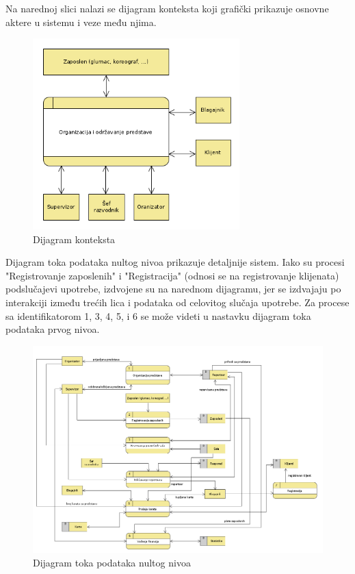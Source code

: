 \documentclass[a4paper]{article}
\begin{document}
Na narednoj slici nalazi se dijagram konteksta koji grafički prikazuje
osnovne aktere u sistemu i veze među njima.

\begin{figure}[H]
  \begin{center}
      \includegraphics[width=80mm]{../images/dfd0.png}
  \end{center}
  \caption{Dijagram konteksta}
  \label{dfd0}
\end{figure}

Dijagram toka podataka nultog nivoa prikazuje detaljnije sistem. Iako su procesi "Registrovanje zaposlenih"
i "Registracija" (odnosi se na registrovanje klijenata) podslučajevi upotrebe, izdvojene su na narednom dijagramu,
jer se izdvajaju po interakciji između trećih lica i podataka od celovitog slučaja upotrebe. Za
procese sa identifikatorom 1, 3, 4, 5, i 6 se može videti u nastavku dijagram toka podataka prvog nivoa.

\begin{figure}[H]
  \begin{center}
      \includegraphics[width=140mm]{../images/dfd1.png}
  \end{center}
  \caption{Dijagram toka podataka nultog nivoa}
  \label{dfd1}
\end{figure}
\end{document}
